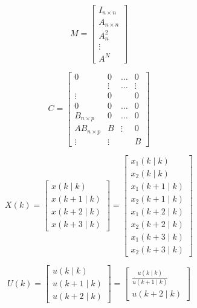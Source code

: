 \begin{equation}
M=\left[\begin{array}{c}I_{n \times n} \\A_{n \times n} \\A_{n}^{2} \\\vdots \\A^{N}\end{array}\right]
\end{equation}

\begin{equation}
C=\left[\begin{array}{cccc}
0 & 0 & \ldots & 0 \\
& \vdots & \ldots & \vdots \\
\vdots & 0 & & 0 \\
0 & 0 & \ldots & 0 \\
B_{n \times p} & 0 & \ldots & 0 \\
A B_{n \times p} & B & \vdots & 0 \\
\vdots & \vdots & & B
\end{array}\right]
\end{equation}

\begin{equation}
X(k)=\left[\begin{array}{c}x(k \mid k) \\x(k+1 \mid k) \\x(k+2 \mid k) \\x(k+3 \mid k)\end{array}\right]=\left[\begin{array}{c}x_{1}(k \mid k) \\x_{2}(k \mid k) \\x_{1}(k+1 \mid k) \\x_{2}(k+1 \mid k) \\x_{1}(k+2 \mid k) \\x_{2}(k+2 \mid k) \\x_{1}(k+3 \mid k) \\x_{2}(k+3 \mid k)\end{array}\right]
\end{equation}

\begin{equation}
U(k)=\left[\begin{array}{c}u(k \mid k) \\u(k+1 \mid k) \\u(k+2 \mid k)\end{array}\right]=\left[\begin{array}{c}\frac{u(k \mid k)}{u(k+1 \mid k)} \\u(k+2 \mid k)\end{array}\right]
\end{equation}

